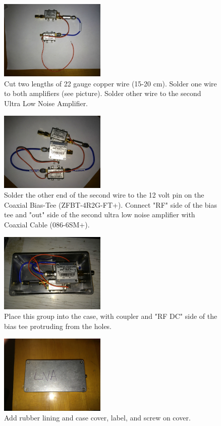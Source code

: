 \documentclass[11pt]{article} %
\begin{document}
\begin{figure}
  \centering
  \caption{Cut two lengths of 22 gauge copper wire (15-20 cm).  Solder one wire to both amplifiers (see picture). Solder  other wire to the second Ultra Low Noise Amplifier. }
  \includegraphics[width=0.45\textwidth]{lna/04.jpeg}
\end{figure}


\begin{figure}
  \centering
  \caption{Solder the other end of the second wire to the 12 volt pin on the Coaxial Bias-Tee (ZFBT-4R2G-FT+). Connect "RF" side of the bias tee and "out" side of the second ultra low noise amplifier with Coaxial Cable (086-6SM+). }
  \includegraphics[width=0.45\textwidth]{lna/05.jpeg}
\end{figure}


\begin{figure}
  \centering
  \caption{Place this group into the case, with coupler and "RF DC" side of the bias tee protruding from the holes. }
  \includegraphics[width=0.45\textwidth]{lna/06.jpeg}
\end{figure}


\begin{figure}
  \centering
  \caption{Add rubber lining and case cover, label, and screw on cover.}
  \includegraphics[width=0.45\textwidth]{lna/07.jpeg}
\end{figure}
\end{document}

